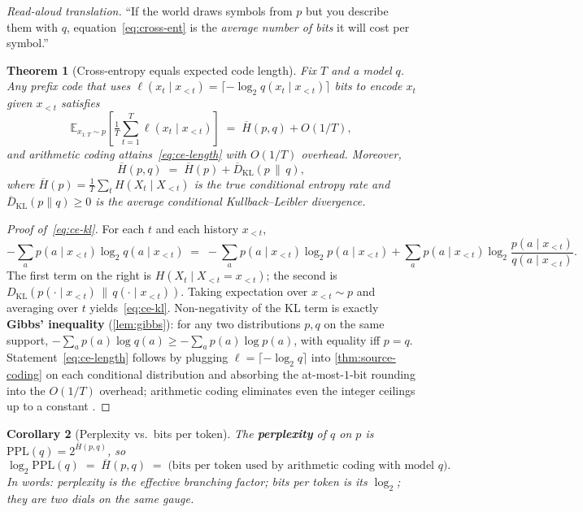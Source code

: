 \documentclass[12pt,a4paper]{article}
\theoremstyle{plain}
\newtheorem{theorem}{Theorem}[section]
\newtheorem{corollary}[theorem]{Corollary}
\theoremstyle{definition}
\begin{document}
\noindent
\emph{Read-aloud translation.}  ``If the world draws symbols from
$p$ but you describe them with $q$, equation~\eqref{eq:cross-ent} is
the \emph{average number of bits} it will cost per symbol.''

\begin{theorem}[Cross-entropy equals expected code length]
\label{thm:ce-code}
Fix $T$ and a model $q$.  Any prefix code that uses
$\ell(x_t \mid x_{<t}) = \lceil -\log_2 q(x_t \mid x_{<t})\rceil$
bits to encode $x_t$ given $x_{<t}$ satisfies
\begin{equation}
  \mathbb{E}_{x_{1:T}\sim p}\!\left[\tfrac{1}{T}\!\sum_{t=1}^{T}\ell(x_t \mid x_{<t})\right]
  \;=\; \overline{H}(p, q) + O(1/T),
  \label{eq:ce-length}
\end{equation}
and arithmetic coding attains~\eqref{eq:ce-length} with $O(1/T)$
overhead.  Moreover,
\begin{equation}
  \overline{H}(p, q)
  \;=\; \overline{H}(p) + \overline{D}_{\mathrm{KL}}(p \,\|\, q),
  \label{eq:ce-kl}
\end{equation}
where $\overline{H}(p) = \tfrac{1}{T}\sum_t H(X_t \mid X_{<t})$ is
the true conditional entropy rate and
$\overline{D}_{\mathrm{KL}}(p\|q) \ge 0$ is the average conditional
Kullback--Leibler divergence.
\end{theorem}

\begin{proof}[Proof of~\eqref{eq:ce-kl}]
For each $t$ and each history $x_{<t}$,
\[
  -\sum_{a} p(a\!\mid\! x_{<t})\log_2 q(a\!\mid\! x_{<t})
  \;=\;
  -\sum_{a} p(a\!\mid\! x_{<t})\log_2 p(a\!\mid\! x_{<t})
  + \sum_a p(a\!\mid\! x_{<t})\log_2\frac{p(a\!\mid\! x_{<t})}{q(a\!\mid\! x_{<t})}.
\]
The first term on the right is $H(X_t \mid X_{<t} = x_{<t})$; the
second is
$D_{\mathrm{KL}}(p(\cdot\mid x_{<t})\,\|\,q(\cdot\mid x_{<t}))$.
Taking expectation over $x_{<t} \sim p$ and averaging over $t$
yields~\eqref{eq:ce-kl}.  Non-negativity of the KL term is exactly
\textbf{Gibbs' inequality} (\cref{lem:gibbs}): for any two
distributions $p, q$ on the same support,
$-\sum_a p(a)\log q(a) \ge -\sum_a p(a)\log p(a)$, with equality iff
$p = q$.  Statement~\eqref{eq:ce-length} follows by plugging
$\ell = \lceil -\log_2 q\rceil$ into \cref{thm:source-coding} on
each conditional distribution and absorbing the at-most-$1$-bit
rounding into the $O(1/T)$ overhead; arithmetic coding eliminates
even the integer ceilings up to a constant
\citep[Ch.~5]{coverthomas2006}.
\end{proof}

\begin{corollary}[Perplexity vs.\ bits per token]
\label{cor:ppl}
The \textbf{perplexity} of $q$ on $p$ is
$\mathrm{PPL}(q) = 2^{\overline{H}(p,q)}$, so
\begin{equation}
  \log_2 \mathrm{PPL}(q) \;=\; \overline{H}(p,q)
  \;=\; \text{(bits per token used by arithmetic coding with model }q\text{)}.
  \label{eq:ppl-bpt}
\end{equation}
In words: \emph{perplexity is the effective branching factor; bits
per token is its $\log_2$; they are two dials on the same gauge.}
\end{corollary}
\end{document}
